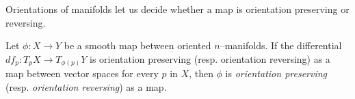 Orientations of manifolds let us decide whether a map is orientation preserving or reversing.

\begin{defn}
	Let $\phi:X\to Y$ be a smooth map between oriented $n$--manifolds.
	If the differential $df_p:T_p X\to T_{\phi(p)} Y$ is orientation preserving (resp. orientation reversing) as a map between vector spaces for every $p$ in $X$, then $\phi$ is \emph{orientation preserving} (resp. \emph{orientation reversing}) as a map.
\end{defn}